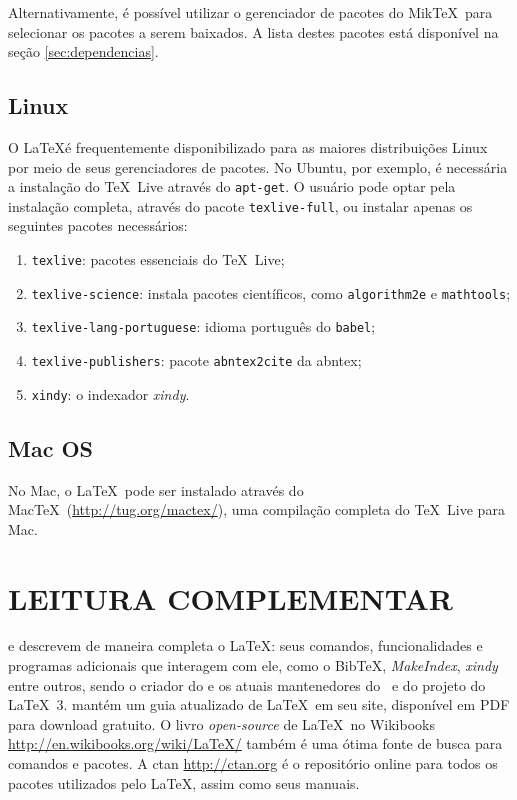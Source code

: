 \documentclass[xindy,rascunho]{fei}
\begin{document}
\begin{teorema}
	Alternativamente, é possível utilizar o gerenciador de pacotes do Mik\TeX\ para selecionar os pacotes a serem baixados. A lista destes pacotes está disponível na seção \ref{sec:dependencias}.
	
	\section{Linux}
	
	O \LaTeX é frequentemente disponibilizado para as maiores distribuições Linux por meio de seus gerenciadores de pacotes. No Ubuntu, por exemplo, é necessária a instalação do \TeX\ Live através do \texttt{apt-get}. O usuário pode optar pela instalação completa, através do pacote \texttt{texlive-full}, ou instalar apenas os seguintes pacotes necessários:
	
	\begin{enumerate}
	\item \texttt{texlive}: pacotes essenciais do \TeX\ Live;
	\item \texttt{texlive-science}: instala pacotes científicos, como \texttt{algorithm2e} e \texttt{mathtools};
	\item \texttt{texlive-lang-portuguese}: idioma português do \texttt{babel};
	\item \texttt{texlive-publishers}: pacote \texttt{abntex2cite} da \gls{abntex};
	\item {}\texttt{xindy}: o indexador \emph{xindy}.
	\end{enumerate}

	\section{Mac OS}
	
	No Mac, o \LaTeX\ pode ser instalado através do Mac\TeX\ (\url{http://tug.org/mactex/}), uma compilação completa do \TeX\ Live para Mac.
	
	\chapter{LEITURA COMPLEMENTAR}
	
	 e  descrevem de maneira completa o \LaTeX: seus comandos, funcionalidades e programas adicionais que interagem com ele, como o Bib\TeX, \emph{MakeIndex}, \emph{xindy} entre outros, sendo  o criador do \LaTeXe e  os atuais mantenedores do \LaTeXe\ e do projeto do \LaTeX\ 3.  mantém um guia atualizado de \LaTeX\ em seu site, disponível em PDF para download gratuito. O livro \emph{open-source} de \LaTeX\ no Wikibooks \url{http://en.wikibooks.org/wiki/LaTeX/} também é uma ótima fonte de busca para comandos e pacotes. A \gls{ctan} \url{http://ctan.org} é o repositório online para todos os pacotes utilizados pelo \LaTeX, assim como seus manuais.
	

\end{teorema}
\end{document}
